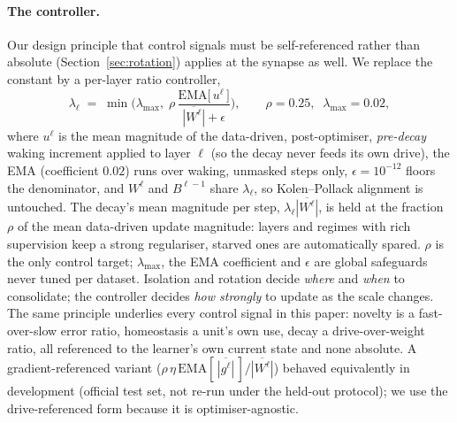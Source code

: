 \documentclass{article}
\begin{document}
\paragraph{The controller.}
Our design principle that control signals must be self-referenced rather than absolute
(Section~\ref{sec:rotation}) applies at the synapse as well. We replace the constant by a
per-layer ratio controller,
\begin{equation}
\lambda_\ell \;=\; \min\!\Big(\lambda_{\max},\; \rho\,
\frac{\mathrm{EMA}\big[\,u^\ell\,\big]}{\overline{|W^\ell|}+\epsilon}\Big),
\qquad \rho=0.25,\;\; \lambda_{\max}=0.02,
\label{eq:controller}
\end{equation}
where $u^\ell$ is the mean magnitude of the data-driven, post-optimiser, \emph{pre-decay}
waking increment applied to layer $\ell$ (so the decay never feeds its own drive), the EMA
(coefficient $0.02$) runs over waking, unmasked steps only, $\epsilon=10^{-12}$ floors the
denominator, and $W^\ell$ and $B^{\ell-1}$ share $\lambda_\ell$, so Kolen--Pollack alignment
is untouched. The decay's mean magnitude per step, $\lambda_\ell\overline{|W^\ell|}$, is held at
the fraction $\rho$ of the mean data-driven update magnitude: layers and regimes with rich
supervision keep a strong regulariser, starved ones are automatically spared. $\rho$ is the
only control target; $\lambda_{\max}$, the EMA coefficient and $\epsilon$ are global
safeguards never tuned per dataset. Isolation and rotation decide \emph{where} and
\emph{when} to consolidate; the controller decides \emph{how strongly} to update as the
scale changes. The same principle underlies every control signal in this paper: novelty is a
fast-over-slow error ratio, homeostasis a unit's own use, decay a drive-over-weight ratio,
all referenced to the learner's own current state and none absolute. A gradient-referenced
variant ($\rho\,\eta\,\mathrm{EMA}[\,\overline{|g^\ell|}\,]/\overline{|W^\ell|}$) behaved
equivalently in development (official test set, not re-run under the held-out protocol); we
use the drive-referenced form because it is optimiser-agnostic.
\end{document}
